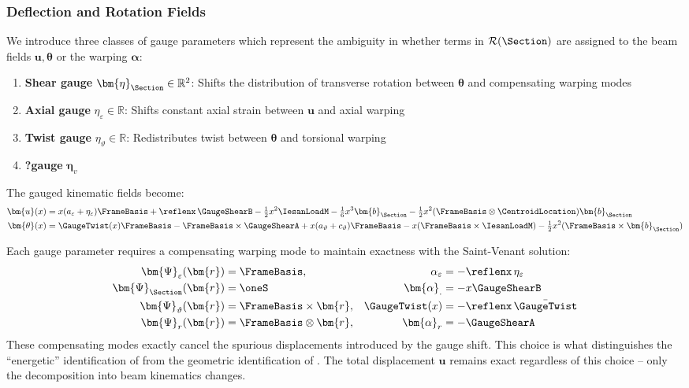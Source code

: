 
\subsubsection{Deflection and Rotation Fields}

We introduce three classes of gauge parameters which represent the ambiguity in whether terms in \(\mathcal{R}(\Section)\) are assigned to the beam fields \(\bm{u},\bm{\theta}\) or the warping \(\bm{\alpha}\):

\begin{enumerate}
\item \textbf{Shear gauge} $\bm{\eta}_{\Section} \in \mathbb{R}^2$: Shifts the distribution of transverse rotation between $\bm{\theta}$ and compensating warping modes
\item \textbf{Axial gauge} $\eta_\varepsilon \in \mathbb{R}$: Shifts constant axial strain between $\bm{u}$ and axial warping
\item \textbf{Twist gauge} $\eta_{\vartheta} \in \mathbb{R}$: Redistributes twist between $\bm{\theta}$ and torsional warping
\item \textbf{?gauge} $\bm{\eta}_{v}$
\end{enumerate}

The gauged kinematic fields become:
%
\begin{equation}
\begin{aligned}
\bm{u}(x) &= x(a_\varepsilon + \eta_\varepsilon)\FrameBasis
+ \reflenx\,\GaugeShearB
- \tfrac{1}{2}x^2\IesanLoadM - \tfrac{1}{6}x^3\bm{b}_{\Section} - \tfrac{1}{2}x^2(\FrameBasis\otimes\CentroidLocation)\bm{b}_{\Section} \\
\bm{\theta}(x) &= \GaugeTwist(x)\FrameBasis - \FrameBasis \times \GaugeShearA + x(a_\vartheta + c_\vartheta)\FrameBasis - x(\FrameBasis \times \IesanLoadM) - \tfrac{1}{2}x^2(\FrameBasis \times \bm{b}_{\Section})
\end{aligned}
\label{eq:gauged-kinematics}
\end{equation}

Each gauge parameter requires a compensating warping mode to maintain exactness with the Saint-Venant solution:
\begin{subequations}
\begin{align*}
\bm{\Psi}_\varepsilon(\bm{r}) &= \FrameBasis,  &\alpha_\varepsilon &= -\reflenx\,\eta_\varepsilon \\
\bm{\Psi}_{\Section}(\bm{r}) &= \oneS &\bm{\alpha}_{.} &= -x\GaugeShearB \\
\bm{\Psi}_\vartheta(\bm{r}) &= \FrameBasis \times \bm{r},  &\GaugeTwist(x) &= -\reflenx\,\bar{\GaugeTwist} \\
\bm{\Psi}_r(\bm{r}) &= \FrameBasis \otimes \bm{r},
&\bm{\alpha}_r &= -\GaugeShearA \\
\end{align*}
\end{subequations}
These compensating modes exactly cancel the spurious displacements introduced by the gauge shift. 
This choice is what distinguishes the  ``energetic'' identification of \cite{renton1991generalized} from
 the geometric identification of \cite{cowper1966shear}. 
 The total displacement
\(\hat{\bm{u}}\) remains exact regardless of this choice -- only the
decomposition into beam kinematics changes.
%

